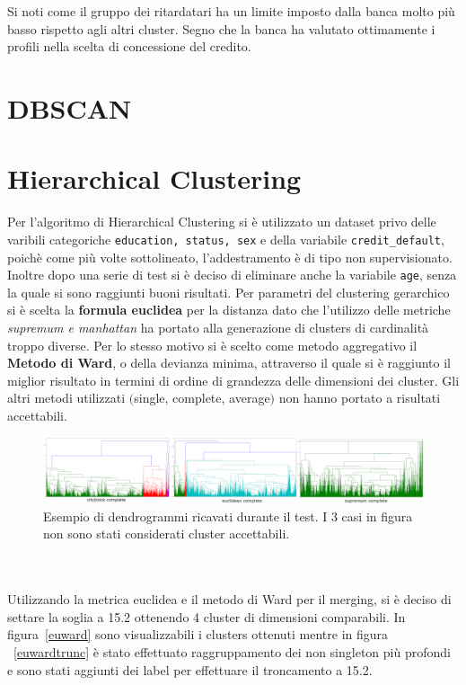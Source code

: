 Si noti come il gruppo dei ritardatari ha un limite imposto dalla banca molto pi\`u basso rispetto agli altri cluster. Segno che la banca ha valutato ottimamente i profili nella scelta di concessione del credito.

\section{DBSCAN}
\newpage


\section{Hierarchical Clustering}
Per l'algoritmo di Hierarchical Clustering si è utilizzato un dataset privo delle varibili categoriche \texttt{education, status, sex} e della variabile \texttt{credit\_default}, poichè come più volte sottolineato, l'addestramento è di tipo non supervisionato. Inoltre dopo una serie di test si è deciso di eliminare anche la variabile \texttt{age}, senza la quale si sono raggiunti buoni risultati. Per parametri del clustering gerarchico si è scelta la \textbf{formula euclidea} per la distanza dato che l'utilizzo delle metriche \textit{supremum e manhattan} ha portato alla generazione di clusters di cardinalità troppo diverse. Per lo stesso motivo si è scelto come metodo aggregativo il \textbf{Metodo di Ward}, o della devianza minima, attraverso il quale si è raggiunto il miglior risultato in termini di ordine di grandezza delle dimensioni dei cluster. Gli altri metodi utilizzati $($single, complete, average$)$ non hanno portato a risultati accettabili.
\begin{figure}[H]
\includegraphics[width=\linewidth]{img/complete.png}
\caption{Esempio di dendrogrammi ricavati durante il test. I 3 casi in figura non sono stati considerati cluster accettabili.}
\label{dendro-complete}
\end{figure} 
\mbox{}\\
\mbox{}\\
Utilizzando la metrica euclidea e il metodo di Ward per il merging, si è deciso di settare la soglia a 15.2 ottenendo 4 cluster di dimensioni comparabili. In figura~\ref{euward} sono visualizzabili i clusters ottenuti mentre in figura ~\ref{euwardtrunc} è stato effettuato raggruppamento dei non singleton più profondi e sono stati aggiunti dei label per effettuare il troncamento a 15.2.
